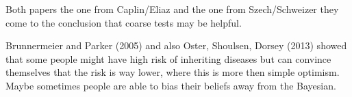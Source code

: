 Both papers the one from Caplin/Eliaz and the one from Szech/Schweizer they come to the conclusion that coarse tests may be helpful.

Brunnermeier and Parker (2005) and also Oster, Shoulsen, Dorsey (2013) showed that some people might have high risk of inheriting diseases but can convince themselves that the risk is way lower, where this is more then simple optimism. \\
Maybe sometimes people are able to bias their beliefs away from the Bayesian. 


\newpage